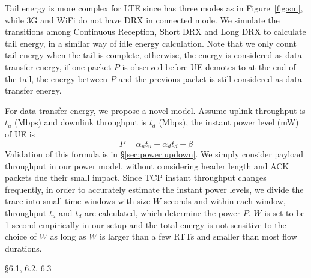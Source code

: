 Tail energy is more complex for LTE since \RC has three modes as in Figure~\ref{fig:sm}, while 3G and WiFi do not have DRX in connected mode. We simulate the transitions among Continuous Reception, Short DRX and Long DRX to calculate tail energy, in a similar way of idle energy calculation. Note that we only count tail energy when the tail is complete, otherwise, the energy is considered as data transfer energy, \ie if one packet $P$ is observed before UE demotes to \RI at the end of the tail, the energy between $P$ and the previous packet is still considered as data transfer energy.
 
For data transfer energy, we propose a novel model. Assume uplink throughput is $t_u$ (Mbps) and downlink throughput is $t_d$ (Mbps), the instant power level (mW) of UE is
\begin{equation*}
\label{for:updown}
P = \alpha_u t_u + \alpha_d t_d+ \beta
\end{equation*}
Validation of this formula is in \S\ref{sec:power.updown}. 
We simply consider payload throughput in our power model, without considering header length and {\sf ACK} packets due their small impact. Since TCP instant throughput changes frequently, in order to accurately estimate the instant power levels, we divide the trace into small time windows with size $W$ seconds and within each window, throughput $t_u$ and $t_d$ are calculated, which determine the power $P$. $W$ is set to be 1 second empirically in our setup and the total energy is not sensitive to the choice of $W$ as long as $W$ is larger than a few RTTs and smaller than most flow durations. 


\S6.1, 6.2, 6.3
